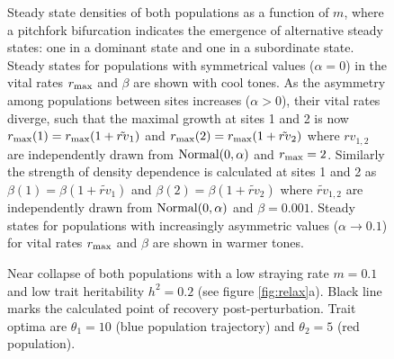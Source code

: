 \documentclass{revtex4}
\begin{document}
\begin{figure}
  \captionsetup{justification=raggedright,
singlelinecheck=false
}
\centering
\caption{
Steady state densities of both populations as a function of $m$, where a pitchfork bifurcation indicates the emergence of alternative steady states: one in a dominant state and one in a subordinate state.
Steady states for populations with symmetrical values ($\alpha=0$) in the vital rates $r_{\rm max}$ and $\beta$ are shown with cool tones.
As the asymmetry among populations between sites increases ($\alpha>0$), their vital rates diverge, such that the maximal growth at sites 1 and 2 is now $r_{\rm max}(1)=r_{\rm max}(1+\tilde{rv}_1)$ and $r_{\rm max}(2)=r_{\rm max}(1+\tilde{rv}_2)$ where $rv_{1,2}$ are independently drawn from $\rm{Normal}(0,\alpha)$ and $r_{\rm max}=2$. 
Similarly the strength of density dependence is calculated at sites 1 and 2 as $\beta(1)=\beta(1+\tilde{rv}_1)$ and $\beta(2)=\beta(1+\tilde{rv}_2)$ where $\tilde{rv}_{1,2}$ are independently drawn from $\rm{Normal}(0,\alpha)$ and $\beta=0.001$.
Steady states for populations with increasingly asymmetric values ($\alpha\rightarrow 0.1$) for vital rates $r_{\rm max}$ and $\beta$ are shown in warmer tones.
} \label{fig:symmetry}
\end{figure}


\begin{figure}
  \captionsetup{justification=raggedright,
singlelinecheck=false
}
\centering
\caption{
Near collapse of both populations with a low straying rate $m=0.1$ and low trait heritability $h^2=0.2$ (see figure \ref{fig:relax}a).
Black line marks the calculated point of recovery post-perturbation.
Trait optima are $\theta_1 = 10$ (blue population trajectory) and $\theta_2 = 5$ (red population).
} \label{fig:relaxtraj_bothlh}
\end{figure}
\end{document}
